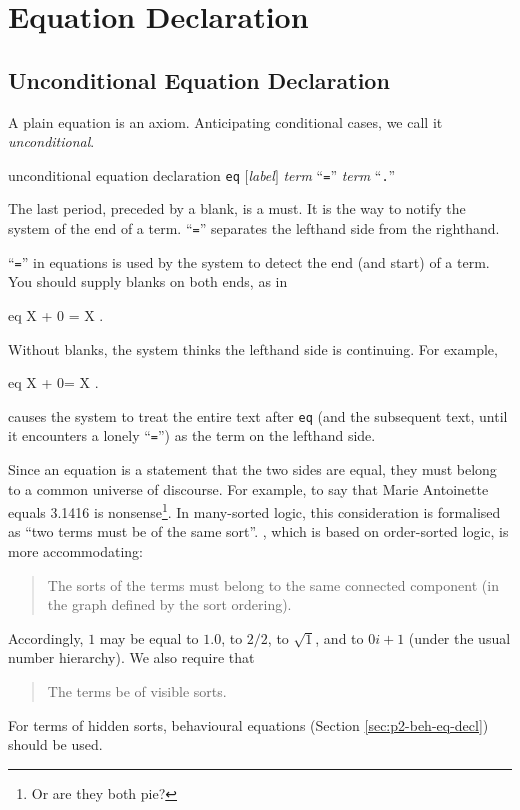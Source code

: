 \documentclass[a4paper]{memoir}
\begin{document}
\section{Equation Declaration}

\subsection{Unconditional Equation Declaration}\label{sec:p2-equation-decl}

A plain equation is an axiom. Anticipating conditional cases,
we call it {\em unconditional}.

\begin{bsyntax} unconditional equation declaration  \Hline
{}
\texttt{eq} $[$\textit{label}$]$ \textit{term} ``\texttt{=}'' \textit{term} ``\texttt{.}''
\end{bsyntax}

The last period, preceded by a blank, is a must. It is the way to
notify the system of the end of a term. ``\verb|=|'' separates
the lefthand side from the righthand.

\begin{warning}
  ``\verb|=|'' in equations is used by the system to detect the
  end (and start) of a term. You should supply blanks on both
  ends, as in
  \begin{vvtm}
\begin{ccode}
    eq X + 0 = X .
  \end{ccode}
\end{vvtm}
  Without blanks, the system thinks the lefthand side is continuing.
  For example,
  \begin{vvtm}
\begin{ccode}
    eq X + 0= X .
  \end{ccode}
\end{vvtm}
  causes the system to treat the entire text after \verb|eq| (and
  the subsequent text, until it encounters a lonely ``\verb|=|'') as
  the term on the lefthand side.
\end{warning}

Since an equation is a statement that the two sides are equal, they
must belong to a common universe of discourse. For example, to say that
Marie Antoinette equals 3.1416 is nonsense\footnote{
Or are they both pie?
}.
In many-sorted logic, this consideration is formalised as
``two terms must be of the same sort''. \cafeobj, which is based on
order-sorted logic, is more accommodating:
\begin{quote}
  The sorts of the terms must belong to the same connected component
  (in the graph defined by the sort ordering).
\end{quote}
Accordingly, $1$ may be equal to $1.0$, to $2/2$, to $\sqrt 1$,
and to $0i + 1$ (under the usual number hierarchy). We also require
that
\begin{quote}
  The terms be of visible sorts.
\end{quote}
For terms of hidden sorts, behavioural equations
(Section \ref{sec:p2-beh-eq-decl}) should be used.
\end{document}
